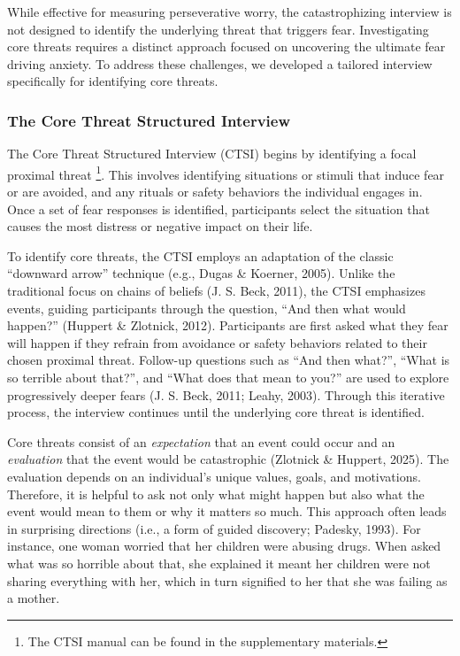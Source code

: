 \documentclass[
  man,floatsintext]{apa7}
\begin{document}
While effective for measuring perseverative worry, the catastrophizing interview is not designed to identify the underlying threat that triggers fear.
Investigating core threats requires a distinct approach focused on uncovering the ultimate fear driving anxiety.
To address these challenges, we developed a tailored interview specifically for identifying core threats.

\subsubsection{The Core Threat Structured Interview}\label{the-core-threat-structured-interview}

The Core Threat Structured Interview (CTSI) begins by identifying a focal proximal threat
\footnote{The CTSI manual can be found in the supplementary materials.}.
This involves identifying situations or stimuli that induce fear or are avoided, and any rituals or safety behaviors the individual engages in.
Once a set of fear responses is identified, participants select the situation that causes the most distress or negative impact on their life.

To identify core threats, the CTSI employs an adaptation of the classic ``downward arrow'' technique (e.g., Dugas \& Koerner, 2005).
Unlike the traditional focus on chains of beliefs (J. S. Beck, 2011), the CTSI emphasizes events, guiding participants through the question, ``And then what would happen?'' (Huppert \& Zlotnick, 2012).
Participants are first asked what they fear will happen if they refrain from avoidance or safety behaviors related to their chosen proximal threat.
Follow-up questions such as ``And then what?'', ``What is so terrible about that?'', and ``What does that mean to you?'' are used to explore progressively deeper fears (J. S. Beck, 2011; Leahy, 2003).
Through this iterative process, the interview continues until the underlying core threat is identified.

Core threats consist of an \emph{expectation} that an event could occur and an \emph{evaluation} that the event would be catastrophic (Zlotnick \& Huppert, 2025).
The evaluation depends on an individual's unique values, goals, and motivations.
Therefore, it is helpful to ask not only what might happen but also what the event would mean to them or why it matters so much.
This approach often leads in surprising directions (i.e., a form of guided discovery; Padesky, 1993).
For instance, one woman worried that her children were abusing drugs.
When asked what was so horrible about that, she explained it meant her children were not sharing everything with her, which in turn signified to her that she was failing as a mother.
\end{document}
